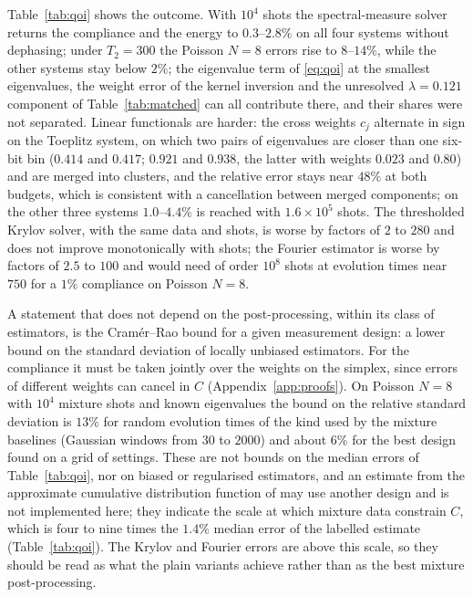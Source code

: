 \documentclass[journal]{IEEEtran}
\begin{document}
Table~\ref{tab:qoi} shows the outcome. With $10^4$ shots the spectral-measure solver returns the compliance and the energy to $0.3$--$2.8\%$ on all four systems without dephasing; under $T_2=300$ the Poisson $N=8$ errors rise to $8$--$14\%$, while the other systems stay below $2\%$; the eigenvalue term of \eqref{eq:qoi} at the smallest eigenvalues, the weight error of the kernel inversion and the unresolved $\lambda=0.121$ component of Table~\ref{tab:matched} can all contribute there, and their shares were not separated. Linear functionals are harder: the cross weights $c_j$ alternate in sign on the Toeplitz system, on which two pairs of eigenvalues are closer than one six-bit bin ($0.414$ and $0.417$; $0.921$ and $0.938$, the latter with weights $0.023$ and $0.80$) and are merged into clusters, and the relative error stays near $48\%$ at both budgets, which is consistent with a cancellation between merged components; on the other three systems $1.0$--$4.4\%$ is reached with $1.6\times10^5$ shots. The thresholded Krylov solver, with the same data and shots, is worse by factors of $2$ to $280$ and does not improve monotonically with shots; the Fourier estimator is worse by factors of $2.5$ to $100$ and would need of order $10^8$ shots at evolution times near $750$ for a $1\%$ compliance on Poisson $N=8$.

A statement that does not depend on the post-processing, within its class of estimators, is the Cram\'er--Rao bound for a given measurement design: a lower bound on the standard deviation of locally unbiased estimators. For the compliance it must be taken jointly over the weights on the simplex, since errors of different weights can cancel in $C$ (Appendix~\ref{app:proofs}). On Poisson $N=8$ with $10^4$ mixture shots and known eigenvalues the bound on the relative standard deviation is $13\%$ for random evolution times of the kind used by the mixture baselines (Gaussian windows from $30$ to $2000$) and about $6\%$ for the best design found on a grid of settings. These are not bounds on the median errors of Table~\ref{tab:qoi}, nor on biased or regularised estimators, and an estimate from the approximate cumulative distribution function of \cite{LinTong2022} may use another design and is not implemented here; they indicate the scale at which mixture data constrain $C$, which is four to nine times the $1.4\%$ median error of the labelled estimate (Table~\ref{tab:qoi}). The Krylov and Fourier errors are above this scale, so they should be read as what the plain variants achieve rather than as the best mixture post-processing.
\end{document}
